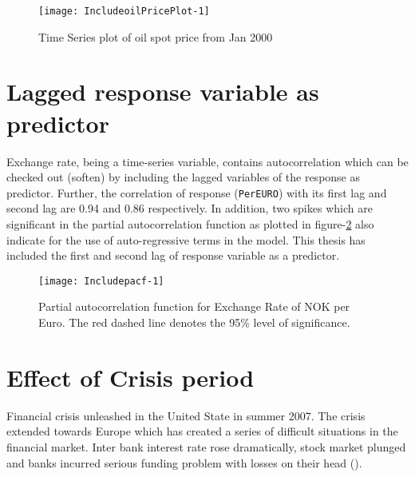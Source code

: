 \documentclass[12pt, lot, lof]{thesis}\usepackage[]{graphicx}\usepackage[]{color}
\makeatletter
\def\maxwidth{ %
  \ifdim\Gin@nat@width>\linewidth
    \linewidth
  \else
    \Gin@nat@width
  \fi
}
\makeatother
\begin{document}
\begin{Schunk}
\begin{figure}

{\centering \texttt{[image: IncludeoilPricePlot-1]} 

}

\caption[Time Series plot of oil spot price from Jan 2000]{Time Series plot of oil spot price from Jan 2000\label{fig:oilPricePlot}}
\end{figure}
\end{Schunk}

\section{Lagged response variable as predictor}
\label{sec:lagRespVar}
Exchange rate, being a time-series variable, contains autocorrelation which can be checked out (soften) by including the lagged variables of the response as predictor. Further, the correlation of response (\texttt{PerEURO}) with its first lag and second lag are 0.94 and 0.86 respectively. In addition, two spikes which are significant in the partial autocorrelation function as plotted in figure-\ref{fig:pacf} also indicate for the use of auto-regressive terms in the model. This thesis has included the first and second lag of response variable as a predictor.

\begin{Schunk}
\begin{figure}[htpb]

{\centering \texttt{[image: Includepacf-1]} 

}

\caption[Partial autocorrelation function for Exchange Rate of NOK per Euro]{Partial autocorrelation function for Exchange Rate of NOK per Euro. The red dashed line denotes the 95\% level of significance.\label{fig:pacf}}
\end{figure}
\end{Schunk}

\section{Effect of Crisis period}
\label{sec:crisisEffect}
Financial crisis unleashed in the United State in summer 2007. The crisis extended towards Europe which has created a series of difficult situations in the financial market. Inter bank interest rate rose dramatically, stock market plunged and banks incurred serious funding problem with losses on their head (\cite{FinCrisis2009Kred}).
\end{document}
